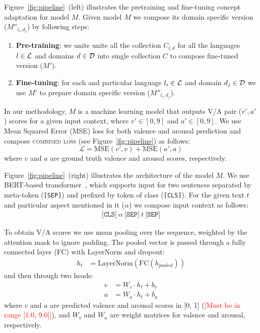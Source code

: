\documentclass[11pt]{article}
\begin{document}
Figure~\ref{fig:pipeline}~(left) illustrates the pretraining and fine-tuning concept adaptation for model $M$.
Given model $M$ we compose its domain specific version ($M''_{l_i,d_j}$) by following steps: 
\begin{enumerate}
    \item \textbf{Pre-training}: we unite unite all the collection $C_{l,d}$ for all the languages $l \in \mathcal{L}{}$ and domains $d \in \mathcal{D}{}$ into single collection $C$ to compose fine-tuned version ($M'$).
    \item \textbf{Fine-tuning}: for each and particular language $l_i \in \mathcal{L}{}$ and domain $d_j \in \mathcal{D}{}$ we use $M'$ to prepare domain specific version ($M''_{l_i,d_j}$).
\end{enumerate}

In our methodology, $M$ is a machine learning model that outputs V/A pair ($v', a'$) scores for a given input context, where $v' \in [0, 9]$ and $a' \in [0, 9]$.
We use Mean Squared Error (MSE) loss for both valence and arousal prediction and compose \textsc{combined loss} (see Figure~\ref{fig:pipeline}) as follows:
\begin{equation}
  \nonumber
  \mathcal{L} = \text{MSE}(v', v) + \text{MSE}(a', a)
\end{equation}
where $v$ and $a$ are ground truth valence and arousal scores, respectively.

Figure~\ref{fig:pipeline}~(right) illustrates the architecture of the model $M$.
We use BERT-based transformer~\cite{liu2019robertarobustlyoptimizedbert}, which supports input for two sentences separated by meta-token (\texttt{[SEP]}) and prefixed by token of class (\texttt{[CLS]}).
For the given text $t$ and particular aspect mentioned in it ($\alpha$) we compose input context as follows:
\begin{align}
    \nonumber
    \texttt{[CLS]}~\alpha~\texttt{[SEP]}~t~\texttt{[SEP]}
\end{align}

To obtain V/A scores we use mean pooling over the sequence, weighted by the attention mask to ignore padding.
The pooled vector is passed through a fully connected layer (FC) with LayerNorm and dropout:
\begin{align}
    \nonumber
    h_{t} &= \text{LayerNorm}(\text{FC}(h_{pooled}))
\end{align}
and then through two heads:
\begin{align}
    \nonumber
    v &= W_v \cdot h_{t} + b_v
    \\
    \nonumber
    a &= W_a \cdot h_{t} + b_a
\end{align}
where $v$ and $a$ are predicted valence and arousal scores in [0, 1] (\textcolor{red}{[Must be in range [1.0, 9.0]]}), and $W_v$ and $W_a$ are weight matrices for valence and arousal, respectively.
\end{document}
